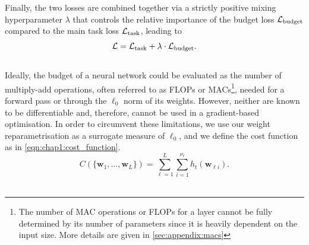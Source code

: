 Finally, the two losses are combined together via a strictly positive mixing
hyperparameter $\lambda$ that controls the relative importance of the budget loss
${\cal L}_\text{budget}$ compared to the main task loss ${\cal L}_\text{task}$,
leading to\\

\begin{equation}
  \label{eqn:chap1:globalloss}
  {\cal L} =  {\cal L}_\text{task} + \lambda \cdot {\cal L}_\text{budget}.
\end{equation} \\

Ideally, the budget of a neural network could be evaluated as the number of
multiply-add operations, often referred to as \acp{FLOP} or
\acp{MAC}\footnote{The number of \ac{MAC} operations or \acp{FLOP} for a layer
cannot be fully determined by its number of parameters since it is heavily
dependent on the input size. More details are given in
\cref{sec:appendix:macs}}, needed for a forward pass or through the $\ell_0$
norm of its weights. However, neither are known to be differentiable and,
therefore, cannot be used in a gradient-based optimisation. In order to
circumvent these limitations, we use our weight reparametrisation as a surrogate
measure of $\ell_0$, and we define the cost function as in
\cref{eqn:chap1:cost_function}.\\

\begin{equation}
  \label{eqn:chap1:cost_function}
  C(\{\mathbf{w}_1,\dots, \mathbf{w}_L\}) = \displaystyle \sum_{\ell=1}^{L} \sum_{i=1}^{\nu_\ell} h_t(\mathbf{w}_{\ell i}).
\end{equation} \\


